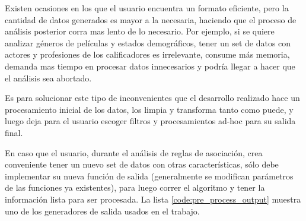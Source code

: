 \documentclass[journal]{IEEEtran}
\begin{document}
Existen ocasiones en los que el usuario encuentra un formato eficiente, pero la cantidad
de datos generados es mayor a la necesaria, haciendo que el proceso de análisis posterior corra
mas lento de lo necesario. Por ejemplo, si se quiere analizar géneros de películas y
estados demográficos, tener un set de datos con actores y profesiones de los calificadores
es irrelevante, consume más memoria, demanda mas tiempo en procesar datos innecesarios
y podría llegar a hacer que el análisis sea abortado.

Es para solucionar este tipo de inconvenientes que el desarrollo realizado hace un
procesamiento inicial de los datos, los limpia y transforma tanto como puede, y luego
deja para el usuario escoger filtros y procesamientos ad-hoc para su salida final.

En caso que el usuario, durante el análisis de reglas de asociación, crea conveniente
tener un nuevo set de datos con otras características, sólo debe implementar su
nueva función de salida (generalmente se modifican parámetros de las funciones ya
existentes), para luego correr el algoritmo y tener la información lista para ser 
procesada.
La lista \ref{code:pre_process_output} muestra uno de los generadores de salida
usados en el trabajo.
\end{document}
